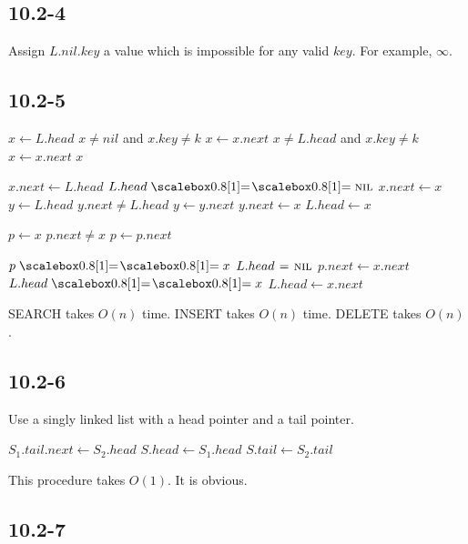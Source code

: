 \documentclass{book}
\begin{document}
\begin{CJK}{UTF8}{gkai}
\subsection*{10.2-4}
Assign $L.nil.key$ a value which is impossible for any valid $key$. For example, 
$\infty$.

\subsection*{10.2-5}

\begin{codebox}
\li $x \gets L.head$
\li \If $x \ne nil$ and $x.key \ne k$
\li \Then $x \gets x.next$
\li \While $x \ne L.head$ and $x.key \ne k$
\li \Do $x \gets x.next$
\End
\End
\li \Return $x$
\end{codebox}

\begin{codebox}
\li $x.next \gets L.head$
\li \If $L.head \isequal \const{nil}$
\li \Then $x.next \gets x$
\li \Else $y \gets L.head$
\li \While $y.next \ne L.head$
\li \Do $y \gets y.next$
\End
\li $y.next \gets x$
\End
\li $L.head \gets x$
\end{codebox}

\begin{codebox}

\li $p \gets x$
\li \While $p.next \ne x$
\li \Do $p \gets p.next$
\End

\li \If $p \isequal x$
\li \Then $L.head \mathrel{\hspace{1pt}=\hspace{1pt}} \textnormal{\scshape nil}$
\li \Else $p.next \gets x.next$
\li \If $L.head \isequal x$
\li \Then $L.head \gets x.next$
\End
\End
\end{codebox}
SEARCH takes $O(n)$ time. INSERT takes $O(n)$ time. DELETE takes $O(n)$.

\subsection*{10.2-6} Use a singly linked list with a head pointer and a tail 
pointer.
\begin{codebox}
\li $S_1.tail.next \gets S_2.head$
\li $S.head \gets S_1.head$
\li $S.tail \gets S_2.tail$
\end{codebox}
This procedure takes $O(1)$. It is obvious.

\subsection*{10.2-7}


\end{CJK}
\end{document}
